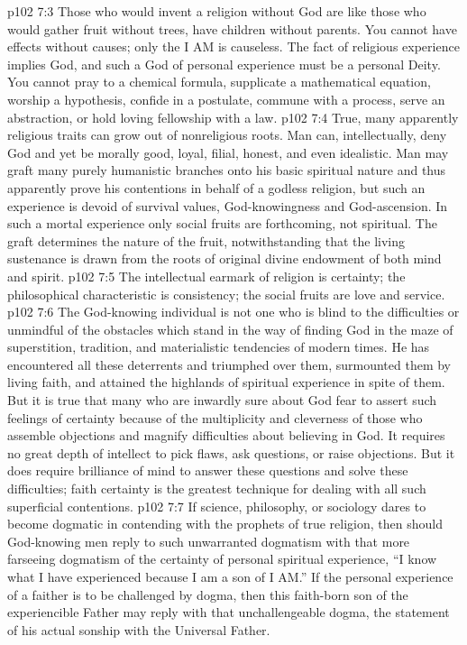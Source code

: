 \vs p102 7:3 \pc Those who would invent a religion without God are like those who would gather fruit without trees, have children without parents. You cannot have effects without causes; only the I AM is causeless. The fact of religious experience implies God, and such a God of personal experience must be a personal Deity. You cannot pray to a chemical formula, supplicate a mathematical equation, worship a hypothesis, confide in a postulate, commune with a process, serve an abstraction, or hold loving fellowship with a law.
\vs p102 7:4 True, many apparently religious traits can grow out of nonreligious roots. Man can, intellectually, deny God and yet be morally good, loyal, filial, honest, and even idealistic. Man may graft many purely humanistic branches onto his basic spiritual nature and thus apparently prove his contentions in behalf of a godless religion, but such an experience is devoid of survival values, God\hyp{}knowingness and God\hyp{}ascension. In such a mortal experience only social fruits are forthcoming, not spiritual. The graft determines the nature of the fruit, notwithstanding that the living sustenance is drawn from the roots of original divine endowment of both mind and spirit.
\vs p102 7:5 The intellectual earmark of religion is certainty; the philosophical characteristic is consistency; the social fruits are love and service.
\vs p102 7:6 \pc The God\hyp{}knowing individual is not one who is blind to the difficulties or unmindful of the obstacles which stand in the way of finding God in the maze of superstition, tradition, and materialistic tendencies of modern times. He has encountered all these deterrents and triumphed over them, surmounted them by living faith, and attained the highlands of spiritual experience in spite of them. But it is true that many who are inwardly sure about God fear to assert such feelings of certainty because of the multiplicity and cleverness of those who assemble objections and magnify difficulties about believing in God. It requires no great depth of intellect to pick flaws, ask questions, or raise objections. But it does require brilliance of mind to answer these questions and solve these difficulties; faith certainty is the greatest technique for dealing with all such superficial contentions.
\vs p102 7:7 \pc If science, philosophy, or sociology dares to become dogmatic in contending with the prophets of true religion, then should God\hyp{}knowing men reply to such unwarranted dogmatism with that more farseeing dogmatism of the certainty of personal spiritual experience, “I know what I have experienced because I am a son of I AM.” If the personal experience of a faither is to be challenged by dogma, then this faith\hyp{}born son of the experiencible Father may reply with that unchallengeable dogma, the statement of his actual sonship with the Universal Father.
